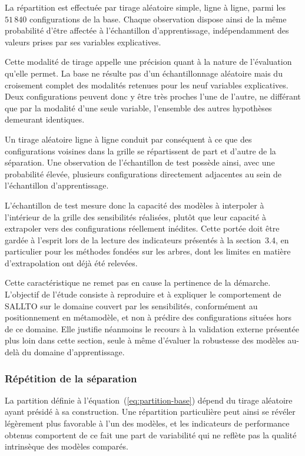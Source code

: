 La répartition est effectuée par tirage aléatoire simple, ligne à ligne, parmi les $51\,840$ configurations de la base. Chaque observation dispose ainsi de la même probabilité d'être affectée à l'échantillon d'apprentissage, indépendamment des valeurs prises par ses variables explicatives.

Cette modalité de tirage appelle une précision quant à la nature de l'évaluation qu'elle permet. La base ne résulte pas d'un échantillonnage aléatoire mais du croisement complet des modalités retenues pour les neuf variables explicatives. Deux configurations peuvent donc y être très proches l'une de l'autre, ne différant que par la modalité d'une seule variable, l'ensemble des autres hypothèses demeurant identiques.

Un tirage aléatoire ligne à ligne conduit par conséquent à ce que des configurations voisines dans la grille se répartissent de part et d'autre de la séparation. Une observation de l'échantillon de test possède ainsi, avec une probabilité élevée, plusieurs configurations directement adjacentes au sein de l'échantillon d'apprentissage.

L'échantillon de test mesure donc la capacité des modèles à interpoler à l'intérieur de la grille des sensibilités réalisées, plutôt que leur capacité à extrapoler vers des configurations réellement inédites. Cette portée doit être gardée à l'esprit lors de la lecture des indicateurs présentés à la section~3.4, en particulier pour les méthodes fondées sur les arbres, dont les limites en matière d'extrapolation ont déjà été relevées.

Cette caractéristique ne remet pas en cause la pertinence de la démarche. L'objectif de l'étude consiste à reproduire et à expliquer le comportement de SALLTO sur le domaine couvert par les sensibilités, conformément au positionnement en métamodèle, et non à prédire des configurations situées hors de ce domaine. Elle justifie néanmoins le recours à la validation externe présentée plus loin dans cette section, seule à même d'évaluer la robustesse des modèles au-delà du domaine d'apprentissage.

\subsubsection{Répétition de la séparation}

La partition définie à l'équation~(\ref{eq:partition-base}) dépend du tirage aléatoire ayant présidé à sa construction. Une répartition particulière peut ainsi se révéler légèrement plus favorable à l'un des modèles, et les indicateurs de performance obtenus comportent de ce fait une part de variabilité qui ne reflète pas la qualité intrinsèque des modèles comparés.

